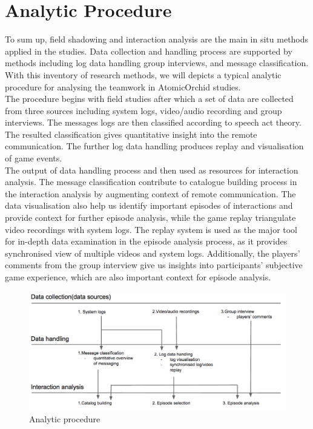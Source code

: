 \section{Analytic Procedure}
To sum up, field shadowing and interaction analysis are the main in situ methods applied in the studies. Data collection and handling process are supported by methods including log data handling group interviews, and message classification. With this inventory of research methods, we will depicts a typical analytic procedure for analysing the teamwork in AtomicOrchid studies. \\

The procedure begins with field studies after which a set of data are collected from three sources including system logs, video/audio recording and group interviews. The messages logs are then classified according to speech act theory. The resulted classification gives quantitative insight into the remote communication. The further log data handling produces replay and visualisation of game events. \\

The output of data handling process and then used as resources for interaction analysis. The message classification contribute to catalogue building process in the interaction analysis by augmenting context of remote communication. The data visualisation also help us identify important episodes of interactions and provide context for further episode analysis, while the game replay triangulate video recordings with system logs. The replay system is used as the major tool for in-depth data examination in the episode analysis process, as it provides synchronised view of multiple videos and system logs. Additionally, the players' comments from the group interview give us insights into participants' subjective game experience, which are also important context for episode analysis.\\



\begin{figure}[h]
  \centering
  \includegraphics[width=1\textwidth]{img/methodology/analyticprocedure}
  \caption{Analytic procedure}
  \label{fig:analyticprocedure}
\end{figure}

